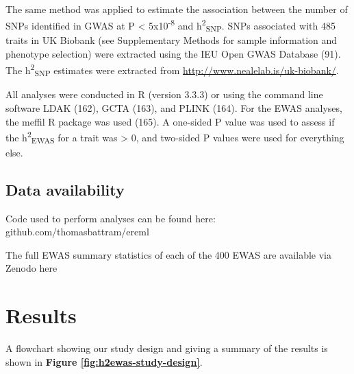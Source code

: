 \documentclass[11pt,oneside]{bristolthesis}
\begin{document}
The same method was applied to estimate the association between the number of SNPs identified in GWAS at P \textless{} 5x10\textsuperscript{-8} and h\textsuperscript{2}\textsubscript{SNP}. SNPs associated with 485 traits in UK Biobank (see Supplementary Methods for sample information and phenotype selection) were extracted using the IEU Open GWAS Database (91). The h\textsuperscript{2}\textsubscript{SNP} estimates were extracted from \url{http://www.nealelab.is/uk-biobank/}.

All analyses were conducted in R (version 3.3.3) or using the command line software LDAK (162), GCTA (163), and PLINK (164). For the EWAS analyses, the meffil R package was used (165). A one-sided P value was used to assess if the h\textsuperscript{2}\textsubscript{EWAS} for a trait was \textgreater{} 0, and two-sided P values were used for everything else.

\hypertarget{data-availability-05}{%
\subsection{Data availability}\label{data-availability-05}}

Code used to perform analyses can be found here: github.com/thomasbattram/ereml

The full EWAS summary statistics of each of the 400 EWAS are available via Zenodo here

\hypertarget{results-05}{%
\section{Results}\label{results-05}}

A flowchart showing our study design and giving a summary of the results is shown in \textbf{Figure \ref{fig:h2ewas-study-design}}.
\end{document}
